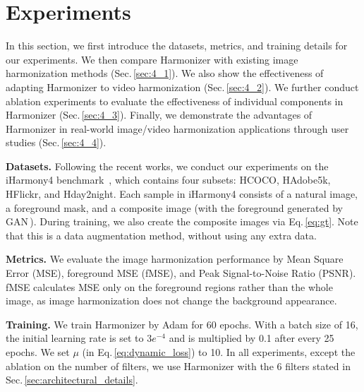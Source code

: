 \documentclass[runningheads]{llncs}
\begin{document}
\section{Experiments}

In this section, we first introduce the datasets, metrics, and training details for our experiments. 
We then compare Harmonizer with existing image harmonization methods (Sec.\,\ref{sec:4_1}).
We also show the effectiveness of adapting Harmonizer to video harmonization (Sec.\,\ref{sec:4_2}). 
We further conduct ablation experiments to evaluate the effectiveness of individual components in Harmonizer (Sec.\,\ref{sec:4_3}). 
Finally, we demonstrate the advantages of Harmonizer in real-world image/video harmonization applications through user studies (Sec.\,\ref{sec:4_4}).

\textbf{Datasets.} Following the recent works, we conduct our experiments on the iHarmony4 benchmark~\cite{DoveNet}, which contains four subsets: HCOCO, HAdobe5k, HFlickr, and Hday2night. Each sample in iHarmony4 consists of a natural image, a foreground mask, and a composite image (with the foreground generated by GAN\,\cite{GAN}). During training, we also create the composite images via Eq.\,\ref{eq:gt}. Note that this is a data augmentation method, without using any extra data. 

\textbf{Metrics.} We evaluate the image harmonization performance by Mean Square Error (MSE), foreground MSE (fMSE), and Peak Signal-to-Noise Ratio (PSNR). 
fMSE calculates MSE only on the foreground regions rather than the whole image, as image harmonization does not change the background appearance. 

\textbf{Training.} We train Harmonizer by Adam for 60 epochs. With a batch size of 16, the initial learning rate is set to $3e^{-4}$ and is multiplied by 0.1 after every 25 epochs. We set $\mu$ (in Eq.\,\ref{eq:dynamic_loss}) to 10. In all experiments, except the ablation on the number of filters, we use Harmonizer with the 6 filters stated in Sec.\,\ref{sec:architectural_details}.
\end{document}
